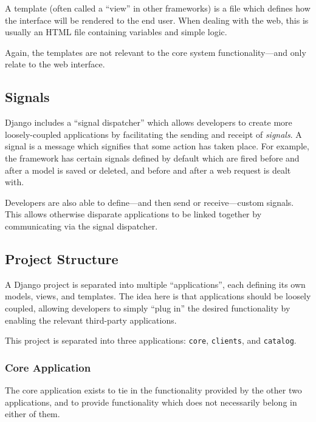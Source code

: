 A template (often called a ``view'' in other frameworks) is a file which
defines how the interface will be rendered to the end user. When dealing with
the web, this is usually an HTML file containing variables and simple logic.

Again, the templates are not relevant to the core system functionality---and
only relate to the web interface.

\subsection{Signals}
\label{sec:implementation-django-signals}

Django includes a ``signal dispatcher'' which allows developers to create more
loosely-coupled applications by facilitating the sending and receipt of
\emph{signals}. A signal is a message which signifies that some action has
taken place. For example, the framework has certain signals defined by default
which are fired before and after a model is saved or deleted, and before and
after a web request is dealt with.

Developers are also able to define---and then send or receive---custom signals.
This allows otherwise disparate applications to be linked together by
communicating via the signal dispatcher.

\subsection{Project Structure}
\label{sec:implementation-django-structure}

A Django project is separated into multiple ``applications'', each defining its
own models, views, and templates. The idea here is that applications should be
loosely coupled, allowing developers to simply ``plug in'' the desired
functionality by enabling the relevant third-party applications.

This project is separated into three applications: \verb!core!, \verb!clients!,
and \verb!catalog!.

\subsubsection{Core Application}
\label{sec:implementation-django-structure-core}

The core application exists to tie in the functionality provided by the other
two applications, and to provide functionality which does not necessarily
belong in either of them.

